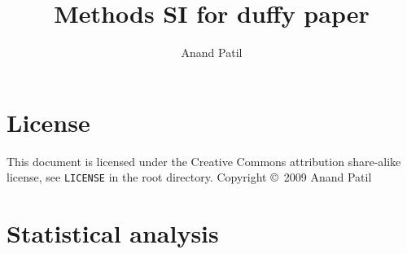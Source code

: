 \documentclass[a4paper]{article}
\begin{document}
\garamond
\title{Methods SI for duffy paper}
\author{Anand Patil}
\maketitle

\section{License} %
\label{sec:license}
This document is licensed under the Creative Commons attribution share-alike license, see \texttt{LICENSE} in the root directory. Copyright \copyright\ 2009 Anand Patil

\section{Statistical analysis} 
\end{document}
